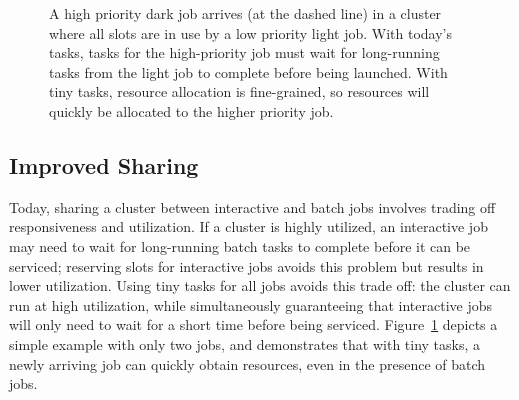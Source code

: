 \begin{figure}[t]
\centering
{}
\vspace{-0.1in}
\caption{
A high priority dark job arrives (at the dashed line) in a cluster where all
slots are in use by a low priority light job.
With today's tasks,
tasks for the high-priority job must wait for long-running tasks from the light job to
complete before being launched.
With tiny tasks, resource
allocation is fine-grained, so resources will quickly be allocated to
the higher priority job.}
\vspace{-2ex}
\label{fig:slot_diagram}
\end{figure}


\subsection{Improved Sharing}
Today, sharing a cluster between interactive and batch jobs involves trading off
responsiveness and utilization. If a cluster is highly utilized,
an interactive job may need to wait for long-running batch tasks to
complete before it can be serviced; reserving slots for
interactive jobs avoids this problem but results in lower utilization.
Using tiny tasks for all jobs avoids this trade off: the cluster can run at
high utilization, while
simultaneously guaranteeing that interactive jobs will only need to wait for
a short time before being serviced. Figure~\ref{fig:slot_diagram} depicts a simple example
with only two jobs, and demonstrates that with tiny tasks, a newly arriving
job can quickly obtain resources, even in the presence
of batch jobs.
